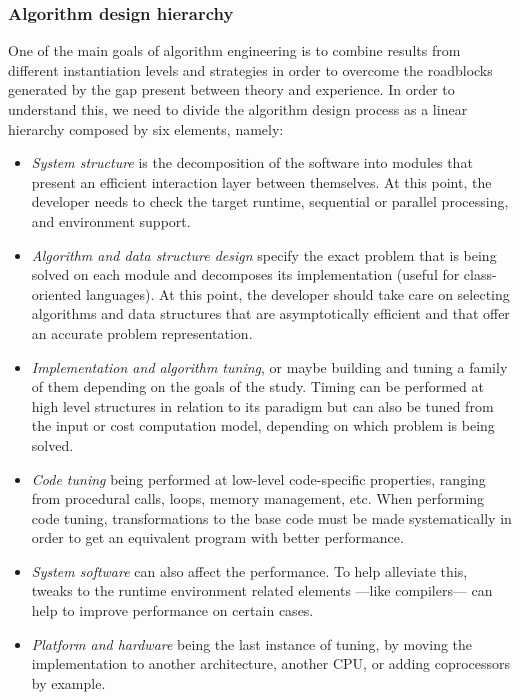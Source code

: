 \subsubsection{Algorithm design hierarchy}

One of the main goals of algorithm engineering is to combine results from different instantiation levels and strategies in order to overcome the roadblocks generated by the gap present between theory and experience. In order to understand this, we need to divide the algorithm design process as a linear hierarchy composed by six elements, namely:\\

\begin{itemize}
    \item \textit{System structure} is the decomposition of the software into modules that present an efficient interaction layer between themselves. At this point, the developer needs to check the target runtime, sequential or parallel processing, and environment support.
    \item \textit{Algorithm and data structure design} specify the exact problem that is being solved on each module and decomposes its implementation (useful for class-oriented languages). At this point, the developer should take care on selecting algorithms and data structures that are asymptotically efficient and that offer an accurate problem representation.
    \item \textit{Implementation and algorithm tuning}, or maybe building and tuning a family of them depending on the goals of the study. Timing can be performed  at high level structures in relation to its paradigm but can also be tuned from the input or cost computation model, depending on which problem is being solved.
    \item \textit{Code tuning} being performed at low-level code-specific properties, ranging from procedural calls, loops, memory management, etc. When performing code tuning, transformations to the base code must be made systematically in order to get an equivalent program with better performance.
    \item \textit{System software} can also affect the performance. To help alleviate this, tweaks to the runtime environment related elements ---like compilers--- can help to improve performance on certain cases.
    \item \textit{Platform and hardware} being the last instance of tuning, by moving the implementation to another architecture, another CPU, or adding coprocessors by example.
\end{itemize}

